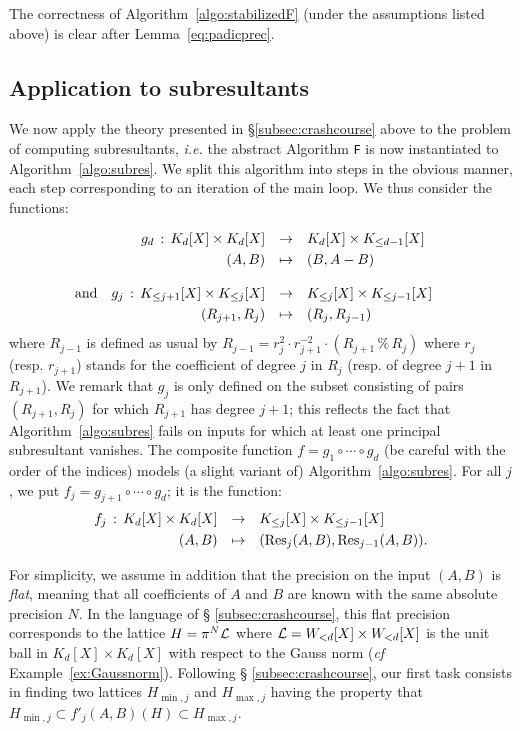 \documentclass{article}
\begin{document}
The correctness of Algorithm~\ref{algo:stabilizedF} (under the 
assumptions listed above) is clear after Lemma~\ref{eq:padicprec}.

\subsection{Application to subresultants}
\label{subsec:stabilization}

We now apply the theory presented in \S \ref{subsec:crashcourse} above 
to the problem of computing subresultants, \emph{i.e.} the abstract 
Algorithm \texttt{F} is now instantiated to Algorithm~\ref{algo:subres}. 
We split this algorithm into steps in the obvious manner, each step 
corresponding to an iteration of the main loop. We thus consider the
functions:

$$\begin{array}{rrclc}
&g_d \, : \, K_d[X] \times K_d[X] &\to &K_d[X] \times K_{\leq d-1}[X] 
\smallskip \\
&(A,B) & \mapsto & (B, A-B) \bigskip \\
\text{and} &g_j \, : \, 
K_{\leq j+1}[X] \times K_{\leq j}[X]
& \to & K_{\leq j}[X] \times K_{\leq j-1}[X] \smallskip \\
&(R_{j+1}, R_j) & \mapsto & (R_j, R_{j-1})
& 
\end{array}$$
where $R_{j-1}$ is defined as usual by
$R_{j-1} = r_j^2 \cdot r_{j+1}^{-2} \cdot 
(R_{j+1} \,\%\, R_j)$
where $r_j$ (resp. $r_{j+1}$) stands for the coefficient of degree $j$ 
in $R_j$ (resp. of degree $j+1$ in $R_{j+1}$). We remark that $g_j$ is 
only defined on the subset consisting of pairs $(R_{j+1}, R_j)$ for 
which $R_{j+1}$ has degree $j+1$; this reflects the fact that 
Algorithm~\ref{algo:subres} fails on inputs for which at least one 
principal
subresultant vanishes. The composite function $f = g_1 \circ \cdots 
\circ g_d$ (be careful with the order of the indices) models (a slight 
variant of) Algorithm~\ref{algo:subres}. For all $j$, we put $f_j = 
g_{j+1} \circ \cdots \circ g_d$; it is the function:
$$\begin{array}{rcl}
f_j \, : \, K_d[X] \times K_d[X] & \to & K_{\leq j}[X] \times 
K_{\leq j-1}[X] \smallskip \\
(A,B) & \mapsto & (\Res_j(A,B), \Res_{j-1}(A,B)).
\end{array}$$

For simplicity, we assume in addition that the precision on the input 
$(A,B)$ is \emph{flat}, meaning that all coefficients of $A$ and $B$ are 
known with the same absolute precision $N$. In the language of \S 
\ref{subsec:crashcourse}, this flat precision corresponds to the lattice 
$H = \pi^N \mathcal L$ where $\mathcal L = W_{<d}[X] \times W_{<d}[X]$ is the 
unit ball in $K_d[X] \times K_d[X]$ with respect to the Gauss norm
(\emph{cf} Example~\ref{ex:Gaussnorm}). Following \S 
\ref{subsec:crashcourse}, our first task consists in finding two 
lattices $H_{\min,j}$ and $H_{\max,j}$ having the property that 
$H_{\min,j} \subset f'_j(A,B)(H) \subset H_{\max,j}$.
\end{document}
